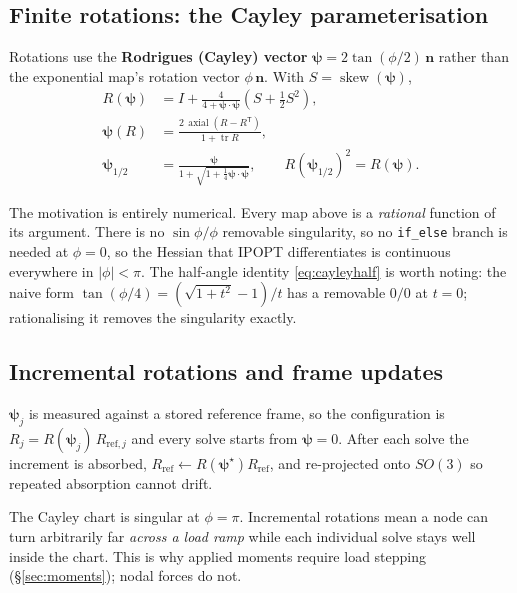 \documentclass[11pt,a4paper]{article}
\newcommand{\code}[1]{\texttt{\small #1}}
\begin{document}
\subsection{Finite rotations: the Cayley parameterisation}

Rotations use the \textbf{Rodrigues (Cayley) vector}
$\boldsymbol{\psi} = 2\tan(\phi/2)\,\mathbf{n}$ rather than the exponential
map's rotation vector $\phi\,\mathbf{n}$. With $S = \operatorname{skew}(\boldsymbol{\psi})$,
\begin{align}
  R(\boldsymbol{\psi}) &= I + \frac{4}{4+\boldsymbol{\psi}\cdot\boldsymbol{\psi}}
    \left(S + \tfrac{1}{2}S^2\right), \label{eq:cayley}\\
  \boldsymbol{\psi}(R) &= \frac{2\,\operatorname{axial}(R-R^{\mathsf T})}{1+\operatorname{tr}R},
    \label{eq:cayleyinv}\\
  \boldsymbol{\psi}_{1/2} &= \frac{\boldsymbol{\psi}}
    {1+\sqrt{1+\tfrac{1}{4}\boldsymbol{\psi}\cdot\boldsymbol{\psi}}},
    \qquad R(\boldsymbol{\psi}_{1/2})^2 = R(\boldsymbol{\psi}).
    \label{eq:cayleyhalf}
\end{align}

The motivation is entirely numerical. Every map above is a \emph{rational}
function of its argument. There is no $\sin\phi/\phi$ removable singularity, so
no \code{if\_else} branch is needed at $\phi=0$, so the Hessian that IPOPT
differentiates is continuous everywhere in $|\phi| < \pi$. The half-angle
identity \eqref{eq:cayleyhalf} is worth noting: the naive form
$\tan(\phi/4) = (\sqrt{1+t^2}-1)/t$ has a removable $0/0$ at $t=0$;
rationalising it removes the singularity exactly.

\subsection{Incremental rotations and frame updates}

$\boldsymbol{\psi}_j$ is measured against a stored reference frame, so the
configuration is $R_j = R(\boldsymbol{\psi}_j)\,R_{\text{ref},j}$ and every
solve starts from $\boldsymbol{\psi} = 0$. After each solve the increment is
absorbed, $R_{\text{ref}} \leftarrow R(\boldsymbol{\psi}^\star) R_{\text{ref}}$,
and re-projected onto $SO(3)$ so repeated absorption cannot drift.

The Cayley chart is singular at $\phi = \pi$. Incremental rotations mean a node
can turn arbitrarily far \emph{across a load ramp} while each individual solve
stays well inside the chart. This is why applied moments require load stepping
(\S\ref{sec:moments}); nodal forces do not.
\end{document}
